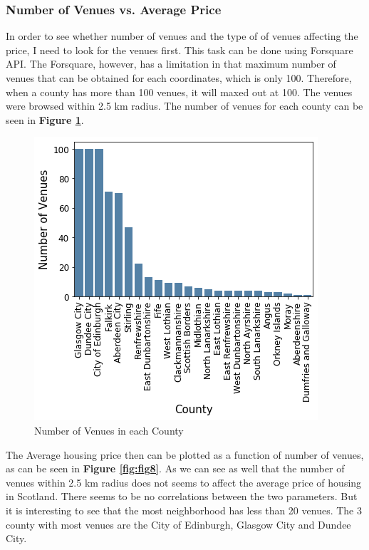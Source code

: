 \documentclass{homeworg}
\begin{document}
\subsubsection{Number of Venues vs. Average Price}
In order to see whether number of venues and the type of of venues affecting the price, I need to look for the venues first. This task can be done using Forsquare API. The Forsquare, however, has a limitation in that maximum number of venues that can be obtained for each coordinates, which is only 100. Therefore, when a county has more than 100 venues, it will maxed out at 100. The venues were browsed within 2.5 km radius. The number of venues for each county can be seen in \textbf{Figure \ref{fig:fig7}}.
\begin{figure}[!h]
    \centering
    \includegraphics[scale=0.9]{figure/Figure_7_County_vs_NumOfVenues.png}
    \caption{Number of Venues in each County}
    \label{fig:fig7}
\end{figure}
\FloatBarrier
The Average housing price then can be plotted as a function of number of venues, as can be seen in \textbf{Figure \ref{fig:fig8}}. As we can see as well that the number of venues within 2.5 km radius does not seems to affect the average price of housing in Scotland. There seems to be no correlations between the two parameters. But it is interesting to see that the most neighborhood has less than 20 venues. The 3 county with most venues are the City of Edinburgh, Glasgow City and Dundee City. 
\end{document}
